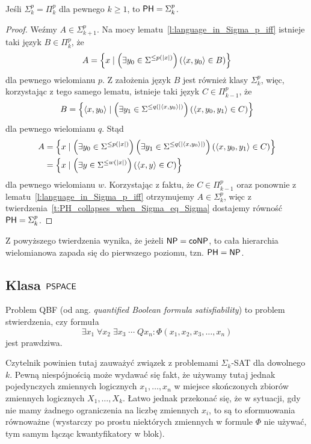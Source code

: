 \begin{theorem}
    Jeśli $\Sigma_k^p = \Pi_k^p$ dla pewnego $k \geq 1$, to $\textsf{PH} = \Sigma_k^p$.
\end{theorem}
\begin{proof}
    Weźmy $A \in \Sigma_{k+1}^p$.
    Na mocy lematu~\ref{l:language_in_Sigma_p_iff} istnieje taki język $B \in \Pi_k^p$, że
    \[ A = \left\{x \mid \left(\exists y_0 \in \Sigma^{\leq p(|x|)}\right) \left(\left\langle x, y_0 \right\rangle \in B\right) \right\} \]
    dla pewnego wielomianu $p$.
    Z założenia język $B$ jest również klasy $\Sigma_k^p$, więc, korzystając z tego samego lematu, istnieje taki język $C \in \Pi_{k-1}^p$, że
    \[ B = \left\{\left\langle x, y_0 \right\rangle \mid \left(\exists y_1 \in \Sigma^{\leq q(|\left\langle x, y_0 \right\rangle|)}\right) \left(\left\langle x, y_0, y_1 \right\rangle \in C\right) \right\} \]
    dla pewnego wielomianu $q$.
    Stąd
    \begin{align*}
      A &= \left\{x \mid \left(\exists y_0 \in \Sigma^{\leq p(|x|)}\right) \left(\exists y_1 \in \Sigma^{\leq q(|\left\langle x, y_0 \right\rangle|)}\right) \left(\left\langle x, y_0, y_1 \right\rangle \in C\right) \right\} \\
          &= \left\{x \mid \left(\exists y \in \Sigma^{\leq w(|x|)}\right) \left(\left\langle x, y \right\rangle \in C\right) \right\}
    \end{align*}
    dla pewnego wielomianu $w$.
    Korzystając z faktu, że $C \in \Pi_{k-1}^p$ oraz ponownie z lematu~\ref{l:language_in_Sigma_p_iff} otrzymujemy $A \in \Sigma_k^p$, więc z twierdzenia~\ref{t:PH_collapses_when_Sigma_eq_Sigma} dostajemy równość $\textsf{PH} = \Sigma_k^p$.

\end{proof}

Z powyższego twierdzenia wynika, że jeżeli $\textsf{NP} = \textsf{coNP}$, to cała hierarchia wielomianowa zapada się do pierwszego poziomu, tzn. $\textsf{PH} = \textsf{NP}$.

\subsection{Klasa $\textsf{PSPACE}$}

Problem QBF (od ang. \textit{quantified Boolean formula satisfiability}) to problem stwierdzenia, czy formuła
\[ \exists x_1 \; \forall x_2 \; \exists x_3 \; \cdots \; Q x_n : \Phi(x_1, x_2, x_3, \ldots, x_n) \]
jest prawdziwa.

\begin{remark*}
    Czytelnik powinien tutaj zauważyć związek z problemami $\Sigma_k$-SAT dla dowolnego $k$.
    Pewną niespójnością może wydawać się fakt, że używamy tutaj jednak pojedynczych zmiennych logicznych $x_1, \ldots, x_n$ w miejsce skończonych zbiorów zmiennych logicznych $X_1, \ldots, X_k$.
    Łatwo jednak przekonać się, że w sytuacji, gdy nie mamy żadnego ograniczenia na liczbę zmiennych $x_i$, to są to sformuowania równoważne (wystarczy po prostu niektórych zmiennych w formule $\Phi$ nie używać, tym samym łącząc kwantyfikatory w blok).
\end{remark*}

